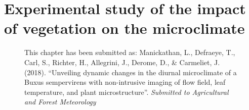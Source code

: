 \chapter{Experimental study of the impact of vegetation on the microclimate}
\label{ch:microclimatestudy}
\def\figdir{chapters/ch04_microclimatestudy/figures}


\begin{figure}[h]
	\centering
	\begin{minipage}{0.9\textwidth}
		\textsf{ \footnotesize This chapter has been submitted as: Manickathan, L., Defraeye, T., Carl, S., Richter, H., Allegrini, J., Derome, D., \& Carmeliet, J. (2018). ``Unveiling dynamic changes in the diurnal microclimate of a Buxus sempervirens with non-intrusive imaging of flow field, leaf temperature, and plant microstructure''. \textit{Submitted to Agricultural and Forest Meteorology}}
	\end{minipage}
\end{figure}
\vspace{2em}

